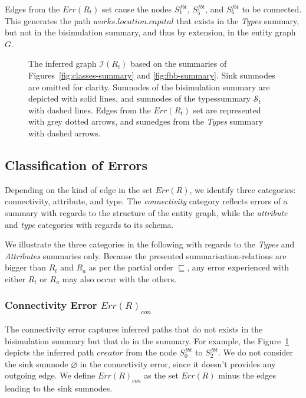 Edges from the $Err(R_t)$ set cause the nodes $S^{fbt}_1$, $S^{fbt}_5$, and $S^{fbt}_6$ to be connected. This generates the path $works.location.capital$ that exists in the \emph{Types} summary, but not in the bisimulation summary, and thus by extension, in the entity graph $G$.

\begin{figure}
	\centering
	\resizebox{\textwidth}{!}{
		
	}
	\caption[The inferred graph $\mathcal{I}(R_t)$ created from the comparison of the Types and Bisimulation summaries]{The inferred graph $\mathcal{I}(R_t)$ based on the summaries of Figures~\ref{fig:classes-summary} and \ref{fig:fbb-summary}.
	Sink sumnodes are omitted for clarity. Sumnodes of the bisimulation summary  are depicted with solid lines, and sumnodes of the \gls{typessummary} $\mathcal{S}_t$ with dashed lines. Edges from the $Err(R_t)$ set are represented with grey dotted arrows, and sumedges from the \emph{Types} summary with dashed arrows.}
	\label{chap5:precision:fig:accuracy}
\end{figure}

\subsection{Classification of Errors}
\label{sec:error-classification}

Depending on the kind of edge in the set $Err(R)$, we identify three categories: \gls{connectivity}, \gls{attribute}, and \gls{type}. The \emph{connectivity} category reflects errors of a summary with regards to the structure of the entity graph, while the \emph{attribute} and \emph{type} categories with regards to its schema.

We illustrate the three categories in the following with regards to the \emph{Types}  and \emph{Attributes}  summaries only. Because the presented \glspl{summarisation-relation} are bigger than $R_t$ and $R_a$ as per the partial order $\sqsubseteq$, any error experienced with either $R_t$ or $R_a$ may also occur with the others.

\subsubsection{Connectivity Error $Err(R)_{con}$}

The connectivity error captures inferred paths that do not exists in the bisimulation summary  but that do in the summary. For example, the Figure~\ref{chap5:precision:fig:accuracy} depicts the inferred path $creator$ from the node $S^{fbt}_0$ to $S^{fbt}_2$.
We do not consider the sink sumnode $\varnothing$ in the connectivity error, since it doesn't provides any outgoing edge. We define $Err(R)_{con}$ as the set $Err(R)$ minus the edges leading to the sink sumnodes.

